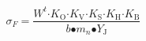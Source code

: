 \begin{equation}
{\sigma }_F\mathrm{=}\frac{W^t\mathrm{\cdot }K_{\mathrm{O}}\mathrm{\cdot }K_{\mathrm{V}}\mathrm{\cdot }K_{\mathrm{S}}\mathrm{\cdot }K_{\mathrm{H}}\mathrm{\cdot }K_{\mathrm{B}}}{b\mathrm{\bullet }m_n\mathrm{\bullet }Y_{\mathrm{J}}}
\end{equation}